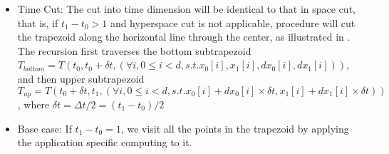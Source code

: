 {\begin{itemize}
	\item Time Cut: The cut into time dimension will be identical
          to that in space cut, that is, if $t_1 - t_0 > 1$
          and hyperspace cut is not applicable, procedure
           will cut the trapezoid along the
          horizontal line through the center, as illustrated in
          . The recursion first traverses the
          bottom subtrapezoid $T_{bottom} = T(t_0, t_0 + \delta t,
          (\forall i, 0 \leq i < d, s.t. x_0[i], x_1[i], dx_0[i],
          dx_1[i]))$, and then upper subtrapezoid $T_{up} = T(t_0 +
          \delta t, t_1, (\forall i, 0 \leq i < d, s.t. x_0[i] + dx_0[i]
          \times \delta t, x_1[i] + dx_1[i] \times \delta t))$, where
          $\delta t = \Delta t / 2 = (t_1 - t_0)/2$
	
	\item Base case: If $t_1 - t_0 = 1$, we visit all the points
          in the trapezoid by applying the application specific
          computing  to it.
\end{itemize}


}
